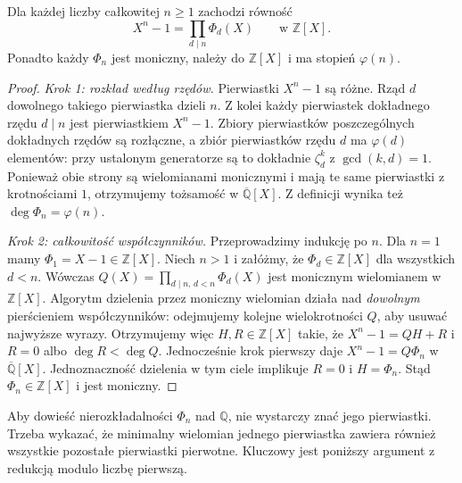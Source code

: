 \begin{twierdzenie}
\label{aa:tw:cyclotomic-product}
Dla każdej liczby całkowitej $n\ge1$ zachodzi równość
\[
X^n-1=\prod_{d\mid n}\Phi_d(X)
\qquad\text{w }\mathbb Z[X].
\]
Ponadto każdy $\Phi_n$ jest moniczny, należy do $\mathbb Z[X]$
i ma stopień $\varphi(n)$.
\end{twierdzenie}
\begin{proof}
\emph{Krok 1: rozkład według rzędów.} Pierwiastki
$X^n-1$ są różne. Rząd $d$ dowolnego takiego pierwiastka
dzieli $n$. Z kolei każdy pierwiastek dokładnego rzędu
$d\mid n$ jest pierwiastkiem $X^n-1$. Zbiory pierwiastków
poszczególnych dokładnych rzędów są rozłączne, a zbiór
pierwiastków rzędu $d$ ma $\varphi(d)$ elementów:
przy ustalonym generatorze są to dokładnie
$\zeta_d^k$ z $\gcd(k,d)=1$. Ponieważ obie strony są
wielomianami monicznymi i mają te same pierwiastki
z krotnościami $1$, otrzymujemy tożsamość w
$\overline{\mathbb Q}[X]$. Z definicji wynika też
$\deg\Phi_n=\varphi(n)$.

\emph{Krok 2: całkowitość współczynników.}
Przeprowadzimy indukcję po $n$. Dla $n=1$ mamy
$\Phi_1=X-1\in\mathbb Z[X]$. Niech $n>1$ i załóżmy,
że $\Phi_d\in\mathbb Z[X]$ dla wszystkich $d<n$.
Wówczas
\(Q(X)=\prod_{d\mid n,\,d<n}\Phi_d(X)\)
jest monicznym wielomianem w $\mathbb Z[X]$.
Algorytm dzielenia przez moniczny wielomian działa nad
\emph{dowolnym} pierścieniem współczynników: odejmujemy
kolejne wielokrotności $Q$, aby usuwać najwyższe wyrazy.
Otrzymujemy więc $H,R\in\mathbb Z[X]$ takie, że
$X^n-1=QH+R$ i $R=0$ albo $\deg R<\deg Q$.
Jednocześnie krok pierwszy daje $X^n-1=Q\Phi_n$
w $\overline{\mathbb Q}[X]$. Jednoznaczność dzielenia
w tym ciele implikuje $R=0$ i $H=\Phi_n$. Stąd
$\Phi_n\in\mathbb Z[X]$ i jest moniczny.
\end{proof}

Aby dowieść nierozkładalności $\Phi_n$ nad $\mathbb Q$,
nie wystarczy znać jego pierwiastki. Trzeba wykazać, że
minimalny wielomian jednego pierwiastka zawiera również
wszystkie pozostałe pierwiastki pierwotne. Kluczowy jest
poniższy argument z redukcją modulo liczbę pierwszą.

